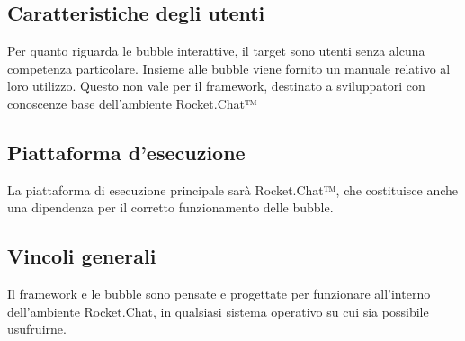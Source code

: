 \subsection{Caratteristiche degli utenti}
Per quanto riguarda le bubble interattive, il target sono utenti senza alcuna competenza particolare. Insieme alle bubble viene fornito un manuale relativo al loro utilizzo. Questo non vale per il framework, destinato a sviluppatori con conoscenze base dell’ambiente Rocket.Chat™ 


\subsection{Piattaforma d’esecuzione}
La piattaforma di esecuzione principale sarà Rocket.Chat™, che costituisce anche una dipendenza per il corretto funzionamento delle bubble.


\subsection{Vincoli generali}
Il framework e le bubble sono pensate e progettate per funzionare all’interno dell’ambiente Rocket.Chat, in qualsiasi sistema operativo su cui sia possibile usufruirne.



